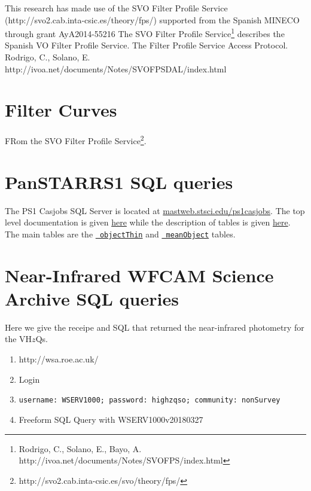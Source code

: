 \documentclass[usenatbib]{mnras}
\begin{document}
This research has made use of the SVO Filter Profile Service
(http://svo2.cab.inta-csic.es/theory/fps/) supported from the Spanish
MINECO through grant AyA2014-55216 
The SVO Filter Profile Service\footnote{Rodrigo, C., Solano, E., Bayo, A. http://ivoa.net/documents/Notes/SVOFPS/index.html}
describes the Spanish VO Filter Profile Service. 
The Filter Profile Service Access Protocol. Rodrigo, C., Solano, E. http://ivoa.net/documents/Notes/SVOFPSDAL/index.html

\newpage

\appendix
\section{Filter Curves} 
FRom the SVO Filter Profile Service\footnote{http://svo2.cab.inta-csic.es/svo/theory/fps/}.


\section{PanSTARRS1 SQL queries}\label{sec:PS1_SQL}
The PS1 Casjobs SQL Server is located at
\href{http://mastweb.stsci.edu/ps1casjobs}{mastweb.stsci.edu/ps1casjobs}.
The top level documentation is given
\href{https://outerspace.stsci.edu/display/PANSTARRS/PS1+Source+extraction+and+catalogs}{here}
while the description of tables is given
\href{https://outerspace.stsci.edu/display/PANSTARRS/PS1+Source+extraction+and+catalogs#PS1Sourceextractionandcatalogs}{here}. The
main tables are the
\href{https://outerspace.stsci.edu/display/PANSTARRS/PS1+ObjectThin+table+fields}{{\tt
objectThin}} and
\href{https://outerspace.stsci.edu/display/PANSTARRS/PS1+MeanObject+table+fields}{{\tt
meanObject}} tables.

\section{Near-Infrared WFCAM Science Archive SQL queries}\label{sec:SQL}
Here we give the receipe and SQL that returned the near-infrared photometry 
for the VH$z$Qs. 

\begin{enumerate}
\item http://wsa.roe.ac.uk/ 
\item Login
\item {\tt username:	WSERV1000;  password: 	highzqso;   community: 	nonSurvey} 
\item Freeform SQL Query with  WSERV1000v20180327
\end{enumerate}











%


\end{document}
